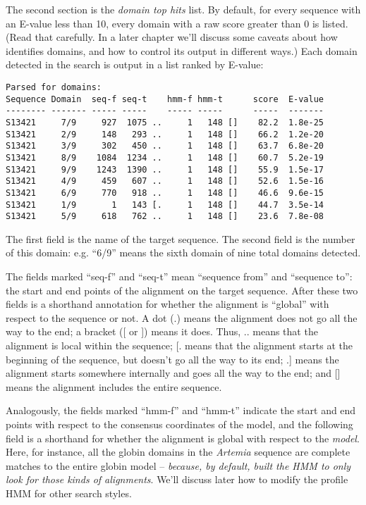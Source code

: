 The second section is the {\em domain top hits} list. By default, for
every sequence with an E-value less than 10, every domain with a raw
score greater than 0 is listed. (Read that carefully. In a later
chapter we'll discuss some caveats about how 
identifies domains, and how to control its output in different ways.)
Each domain detected in the search is output in a list ranked by
E-value:

{\small\begin{verbatim}
Parsed for domains:
Sequence Domain  seq-f seq-t    hmm-f hmm-t      score  E-value
-------- ------- ----- -----    ----- -----      -----  -------
S13421     7/9     927  1075 ..     1   148 []    82.2  1.8e-25
S13421     2/9     148   293 ..     1   148 []    66.2  1.2e-20
S13421     3/9     302   450 ..     1   148 []    63.7  6.8e-20
S13421     8/9    1084  1234 ..     1   148 []    60.7  5.2e-19
S13421     9/9    1243  1390 ..     1   148 []    55.9  1.5e-17
S13421     4/9     459   607 ..     1   148 []    52.6  1.5e-16
S13421     6/9     770   918 ..     1   148 []    46.6  9.6e-15
S13421     1/9       1   143 [.     1   148 []    44.7  3.5e-14
S13421     5/9     618   762 ..     1   148 []    23.6  7.8e-08
\end{verbatim}}

The first field is the name of the target sequence. The second field
is the number of this domain: e.g. ``6/9'' means the sixth domain of
nine total domains detected.

The fields marked ``seq-f'' and ``seq-t'' mean ``sequence from'' and
``sequence to'': the start and end points of the alignment on the
target sequence. After these two fields is a shorthand annotation for
whether the alignment is ``global'' with respect to the sequence or
not. A dot (.) means the alignment does not go all the way to the end;
a bracket ([ or ]) means it does. Thus, .. means that the alignment is
local within the sequence; [. means that the alignment starts at the
beginning of the sequence, but doesn't go all the way to its end; .]
means the alignment starts somewhere internally and goes all the way
to the end; and [] means the alignment includes the entire sequence.

Analogously, the fields marked ``hmm-f'' and ``hmm-t'' indicate the
start and end points with respect to the consensus coordinates of the
model, and the following field is a shorthand for whether the
alignment is global with respect to the {\em model}. Here, for
instance, all the globin domains in the {\em Artemia} sequence are
complete matches to the entire globin model -- {\em because, by
default,  built the HMM to only look for those kinds of
alignments}. We'll discuss later how to modify the profile HMM for
other search styles.

